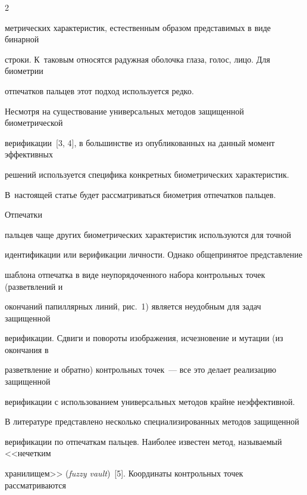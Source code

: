 \begin{multicols}{2}
\vspace*{6pt}




\addtocounter{figure}{1}





\noindent

мет\-ри\-че\-ских характеристик, естественным образом представимых в виде бинарной 

строки. К~таковым относятся радужная оболочка глаза, голос, лицо. Для био\-мет\-рии 

отпечатков пальцев этот подход используется редко. 

      

      Несмотря на существование универсальных методов защищенной биометрической 

верификации~[3, 4], в большинстве из опубликованных на данный момент эффективных 

решений используется специфика конкретных биометрических характеристик. 

В~настоящей статье будет рассматриваться биометрия отпечатков пальцев. 



Отпечатки 

пальцев чаще других биометрических характеристик используются для точной 

идентификации или верификации личности. Однако общепринятое представление 

шаблона отпечатка в виде неупорядоченного набора контрольных точек (разветвлений и 

окончаний папиллярных линий, рис.~1) является неудобным для задач защищенной 

верификации. Сдвиги и повороты изображения, исчезновение и мутации (из окончания в 

разветвление и обратно) контрольных точек~--- все это делает реализацию защищенной 

верификации с использованием универсальных методов крайне неэффективной.

      



      

      В литературе представлено несколько специализированных методов защищенной 

верификации по отпечаткам пальцев. Наиболее известен метод, называемый <<нечетким 

хранилищем>> (\textit{fuzzy vault})~[5]. Координаты контрольных точек рассматриваются 


\end{multicols}
